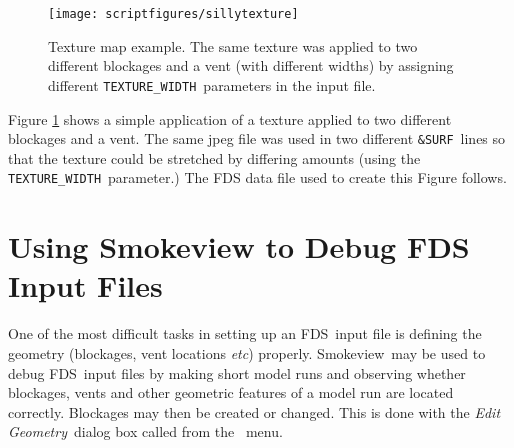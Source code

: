 \documentclass[11pt,twoside]{book}
\newcommand{\fdsinput}[1]{
{
\scriptsize

}
}
\newcommand{\figoptions}{hbp}
\newcommand{\fds}{{FDS}}
\newcommand{\Smokeview}{{Smokeview}}
\newcommand{\etc}{{\em etc}}
\begin{document}
\begin{figure}[\figoptions]
\centerline{\texttt{[image: scriptfigures/sillytexture]}
} \caption [Texture map example.] {
Texture map example.  The same texture was applied to two different
blockages and a vent (with different widths) by assigning different {\tt TEXTURE\_WIDTH}\
parameters in the input file.
} \label{figTextures}
\end{figure}
Figure \ref{figTextures} shows a simple application of a texture
applied to two different blockages and a vent.  The same jpeg file
was used in two different {\tt \&SURF}\ lines so that the texture
could be stretched by differing amounts (using the {\tt
TEXTURE\_WIDTH}\ parameter.)  The FDS data file used to create
this Figure follows.

\fdsinput{sillytexture.fds}


\chapter{Using Smokeview to Debug FDS Input Files} One of the most difficult
tasks in setting up an \fds\ input file is defining the geometry
(blockages, vent locations \etc) properly. \Smokeview\ may be used
to debug \fds\ input files by making short model runs and observing
whether blockages, vents and other geometric features of a model run are
located correctly. Blockages may then be created or changed. This
is done with the {\em Edit Geometry}\ dialog box called from the
\fbox{\tt Dialogs}\ menu.
\end{document}

